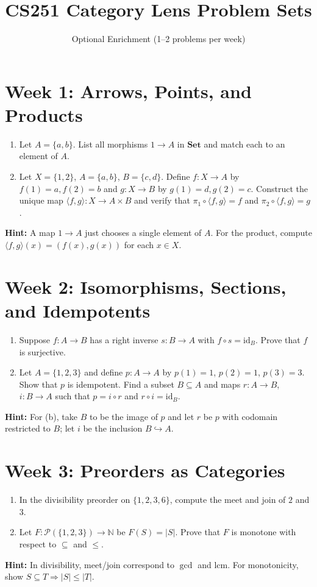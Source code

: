 \documentclass[11pt]{article}
\newcommand{\N}{\mathbb{N}}
\newcommand{\Pow}{\mathcal{P}}
\newcommand{\Set}{\mathbf{Set}}
\newcommand{\id}{\mathrm{id}}
\begin{document}
\title{CS251 Category Lens Problem Sets}
\author{Optional Enrichment (1--2 problems per week)}
\date{}
\maketitle

\tableofcontents
\newpage

\section{Week 1: Arrows, Points, and Products}
\begin{enumerate}[label=(\alph*)]
  \item Let $A = \{a, b\}$. List all morphisms $1 \to A$ in $\Set$ and match each to an element of $A$.
  \item Let $X = \{1,2\}$, $A = \{a,b\}$, $B = \{c,d\}$. Define $f: X \to A$ by $f(1)=a, f(2)=b$ and $g: X \to B$ by $g(1)=d, g(2)=c$. Construct the unique map $\langle f,g \rangle: X \to A \times B$ and verify that $\pi_1 \circ \langle f,g \rangle = f$ and $\pi_2 \circ \langle f,g \rangle = g$.
\end{enumerate}
\textbf{Hint:} A map $1 \to A$ just chooses a single element of $A$. For the product, compute $\langle f,g \rangle(x) = (f(x), g(x))$ for each $x \in X$.

\section{Week 2: Isomorphisms, Sections, and Idempotents}
\begin{enumerate}[label=(\alph*)]
  \item Suppose $f: A \to B$ has a right inverse $s: B \to A$ with $f \circ s = \id_B$. Prove that $f$ is surjective.
  \item Let $A = \{1,2,3\}$ and define $p: A \to A$ by $p(1)=1$, $p(2)=1$, $p(3)=3$. Show that $p$ is idempotent. Find a subset $B \subseteq A$ and maps $r: A \to B$, $i: B \to A$ such that $p = i \circ r$ and $r \circ i = \id_B$.
\end{enumerate}
\textbf{Hint:} For (b), take $B$ to be the image of $p$ and let $r$ be $p$ with codomain restricted to $B$; let $i$ be the inclusion $B \hookrightarrow A$.

\section{Week 3: Preorders as Categories}
\begin{enumerate}[label=(\alph*)]
  \item In the divisibility preorder on $\{1,2,3,6\}$, compute the meet and join of $2$ and $3$.
  \item Let $F: \Pow(\{1,2,3\}) \to \N$ be $F(S) = |S|$. Prove that $F$ is monotone with respect to $\subseteq$ and $\leq$.
\end{enumerate}
\textbf{Hint:} In divisibility, meet/join correspond to $\gcd$ and $\text{lcm}$. For monotonicity, show $S \subseteq T \Rightarrow |S| \leq |T|$.
\end{document}

